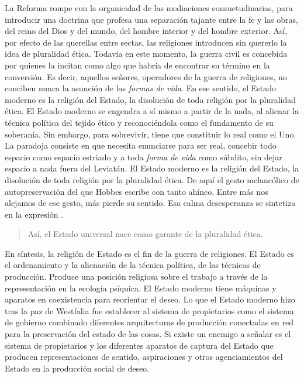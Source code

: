 La Reforma rompe con la organicidad de las mediaciones consuetudinarias, para introducir una doctrina que profesa una separación tajante entre la fe y las obras, del reino del Dios y del mundo, del hombre interior y del hombre exterior. Así, por efecto de las querellas entre sectas, las religiones introducen sin quererlo la idea de pluralidad ética. Todavía en este momento, la guerra civil es concebida por quienes la incitan como algo que habría de encontrar su término en la conversión. Es decir, aquellos señores, operadores de la guerra de religiones, no conciben nunca la asunción de las \emph{formas de vida}. En ese sentido, el Estado moderno es la religión del Estado, la disolución de toda religión por la pluralidad ética. El Estado moderno se engendra a sí mismo a partir de la nada, al alienar la técnica política del tejido ético y reconociéndola como el fundamento de su soberanía. Sin embargo, para sobrevivir, tiene que constituir lo real como el Uno. La paradoja consiste en que necesita enunciarse para ser real, concebir todo espacio como espacio estriado y a toda \emph{forma de vida} como súbdito, sin dejar espacio a nada fuera del Leviatán. El Estado moderno es la religión del Estado, la disolución de toda religión por la pluralidad ética. De aquí el gesto melancólico de autopreservación del que Hobbes escribe con tanto ahínco. Entre más nos alejamos de ese gesto, más pierde su sentido. Esa calma desesperanza se sintetiza en la expresión \autocite[pp. 31-58]{tiqqunIntroduccionGuerraCivil2008}.

\begin{quote}
    Así, el Estado universal nace como garante de la pluralidad ética.
\end{quote}

En síntesis, la religión de Estado es el fin de la guerra de religiones. El Estado es el ordenamiento y la alienación de la técnica política, de las técnicas de producción. Produce una posición religiosa sobre el trabajo a través de la representación en la ecología psíquica. El Estado moderno tiene máquinas y aparatos en coexistencia para reorientar el deseo. Lo que el Estado moderno hizo tras la paz de Westfalia fue establecer al sistema de propietarios como el sistema de gobierno combinado diferentes arquitecturas de producción conectadas en red para la preservación del estado de las cosas. Si existe un enemigo a señalar es el sistema de propietarios y los diferentes aparatos de captura del Estado que producen representaciones de sentido, aspiraciones y otros agenciamientos del Estado en la producción social de deseo.

